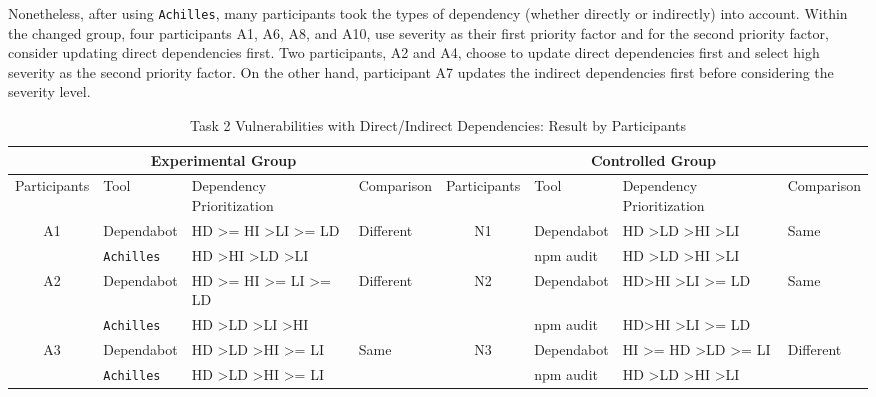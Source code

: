 \documentclass[conference]{IEEEtran}
\begin{document}
	Nonetheless, after using \texttt{Achilles}, many participants took the types of dependency (whether directly or indirectly) into account. Within the changed group, four participants A1, A6, A8, and A10, use severity as their first priority factor and for the second priority factor, consider updating direct dependencies first. Two participants, A2 and A4, choose to update direct dependencies first and select high severity as the second priority factor. On the other hand, participant A7 updates the indirect dependencies first before considering the severity level.
	
	
	
	\begin{table}[tb]
		\caption{Task 2 Vulnerabilities with Direct/Indirect Dependencies: Result by Participants}
		\centering
		\begin{tabular}{clll|clll}
			\toprule
			\multicolumn{4}{c|}{Experimental Group} & \multicolumn{4}{c}{Controlled Group}  \\ 
			\midrule
			Participants         & Tool       & Dependency Prioritization & Comparison & Participants & Tool  & Dependency Prioritization & Comparison \\ 
			\midrule
			\multirow{2}{*}{A1}  & Dependabot & HD \textgreater{}= HI \textgreater LI \textgreater{}= LD    & \multirow{2}{*}{Different}      & \multirow{2}{*}{N1} & Dependabot & HD \textgreater LD \textgreater HI \textgreater LI  & \multirow{2}{*}{Same} \\ 
			& \texttt{Achilles}   & HD \textgreater HI \textgreater LD \textgreater LI & & & npm audit & HD \textgreater LD \textgreater HI \textgreater LI & \\ 
			\midrule
			\multirow{2}{*}{A2}  & Dependabot & HD \textgreater{}= HI \textgreater{}= LI \textgreater{}= LD & \multirow{2}{*}{Different}      & \multirow{2}{*}{N2} & Dependabot & HD\textgreater HI \textgreater LI \textgreater = LD &  \multirow{2}{*}{Same} \\
			& \texttt{Achilles}   & HD \textgreater LD \textgreater LI \textgreater HI & & & npm audit & HD\textgreater HI \textgreater LI \textgreater = LD &  \\ 
			\midrule
			\multirow{2}{*}{A3}  & Dependabot & HD \textgreater LD \textgreater HI \textgreater{}= LI & \multirow{2}{*}{Same} & \multirow{2}{*}{N3} & Dependabot & HI \textgreater{}= HD \textgreater LD \textgreater{}= LI &  \multirow{2}{*}{Different} \\ 
			& \texttt{Achilles}   & HD \textgreater LD \textgreater HI \textgreater{}= LI & & & npm audit & HD \textgreater LD \textgreater HI \textgreater LI  & \\ 

\end{tabular}
\end{table}
\end{document}
